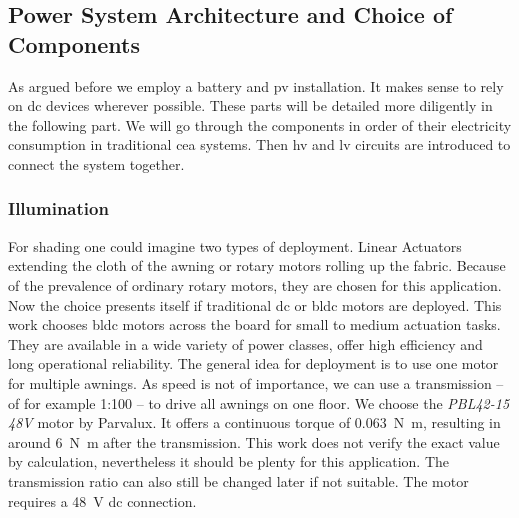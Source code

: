 \subsection{Power System Architecture and Choice of Components}
\label{sub:power-arch}

As argued before we employ a battery and \ac{pv} installation.
It makes sense to rely on \ac{dc} devices wherever possible.
These parts will be detailed more diligently in the following part.
We will go through the components in order of their electricity consumption in traditional \ac{cea} systems.
Then \ac{hv} and \ac{lv} circuits are introduced to connect the system together.

\subsubsection{Illumination}
For shading one could imagine two types of deployment.
Linear Actuators extending the cloth of the awning or rotary motors rolling up the fabric.
Because of the prevalence of ordinary rotary motors, they are chosen for this application.
Now the choice presents itself if traditional \ac{dc} or \ac{bldc} motors are deployed.
This work chooses \ac{bldc} motors across the board for small to medium actuation tasks.
They are available in a wide variety of power classes, offer high efficiency and long operational reliability.
The general idea for deployment is to use one motor for multiple awnings.
As speed is not of importance, we can use a transmission -- of for example 1:100 -- to drive all awnings on one floor.
We choose the \textit{PBL42-15 48V} motor by Parvalux.
It offers a continuous torque of \SI{0.063}{\N\m}, resulting in around \SI{6}{\N\m} after the transmission.
This work does not verify the exact value by calculation, nevertheless it should be plenty for this application.
The transmission ratio can also still be changed later if not suitable.
The motor requires a \SI{48}{\V} \ac{dc} connection.

